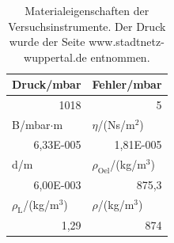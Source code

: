 \documentclass[12pt]{scrartcl}
\begin{document}
\begin{table}[H]
\caption{Materialeigenschaften der Versuchsinstrumente. Der Druck wurde der Seite www.stadtnetz-wuppertal.de entnommen.}
\begin{center}
\begin{tabular}{|l|l|}
\hline
Druck/mbar & Fehler/mbar \\ \hline
\multicolumn{1}{|r|}{1018} & \multicolumn{1}{r|}{5} \\ \hline
B/mbar$\cdot$m & $\eta$/(Ns/m$^2$) \\ \hline
\multicolumn{1}{|r|}{6,33E-005} & \multicolumn{1}{r|}{1,81E-005} \\ \hline
d/m & $\rho_\text{Oel}$/(kg/m$^3$) \\ \hline
\multicolumn{1}{|r|}{6,00E-003} & \multicolumn{1}{r|}{875,3} \\ \hline
$\rho_\text{L}$/(kg/m$^3$) & $\rho$/(kg/m$^3$) \\ \hline
\multicolumn{1}{|r|}{1,29} & \multicolumn{1}{r|}{874} \\ \hline
\end{tabular}
\end{center}
\label{tab:messwerte_m}
\end{table}
\end{document}
